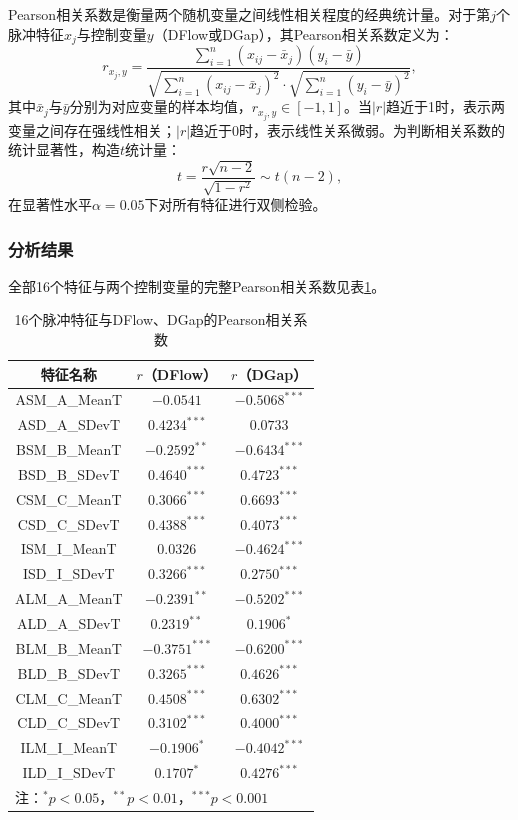 \documentclass[UTF8,a4paper,12pt]{ctexart}
\begin{document}
Pearson相关系数是衡量两个随机变量之间线性相关程度的经典统计量。对于第$j$个脉冲特征$x_j$与控制变量$y$（DFlow或DGap），其Pearson相关系数定义为：
\begin{equation}
r_{x_j,y}=\frac{\displaystyle\sum_{i=1}^{n}(x_{ij}-\bar{x}_j)(y_i-\bar{y})}{\displaystyle\sqrt{\sum_{i=1}^{n}(x_{ij}-\bar{x}_j)^2}\cdot\sqrt{\sum_{i=1}^{n}(y_i-\bar{y})^2}},
\label{eq:pearson}
\end{equation}
其中$\bar{x}_j$与$\bar{y}$分别为对应变量的样本均值，$r_{x_j,y}\in[-1,1]$。当$|r|$趋近于1时，表示两变量之间存在强线性相关；$|r|$趋近于0时，表示线性关系微弱。为判断相关系数的统计显著性，构造$t$统计量：
\begin{equation}
t=\frac{r\sqrt{n-2}}{\sqrt{1-r^2}}\sim t(n-2),
\end{equation}
在显著性水平$\alpha=0.05$下对所有特征进行双侧检验。

\subsubsection{分析结果}

全部16个特征与两个控制变量的完整Pearson相关系数见表\ref{tab:corr-full}。

\begin{table}[H]
\centering
\caption{16个脉冲特征与DFlow、DGap的Pearson相关系数}
\label{tab:corr-full}
\begin{tabular}{ccc}
\toprule
特征名称 & $r$（DFlow） & $r$（DGap） \\
\midrule
ASM\_A\_MeanT & $-0.0541$ & $-0.5068^{***}$ \\
ASD\_A\_SDevT & $0.4234^{***}$ & $0.0733$ \\
BSM\_B\_MeanT & $-0.2592^{**}$ & $-0.6434^{***}$ \\
BSD\_B\_SDevT & $0.4640^{***}$ & $0.4723^{***}$ \\
CSM\_C\_MeanT & $0.3066^{***}$ & $0.6693^{***}$ \\
CSD\_C\_SDevT & $0.4388^{***}$ & $0.4073^{***}$ \\
ISM\_I\_MeanT & $0.0326$ & $-0.4624^{***}$ \\
ISD\_I\_SDevT & $0.3266^{***}$ & $0.2750^{***}$ \\
ALM\_A\_MeanT & $-0.2391^{**}$ & $-0.5202^{***}$ \\
ALD\_A\_SDevT & $0.2319^{**}$ & $0.1906^{*}$ \\
BLM\_B\_MeanT & $-0.3751^{***}$ & $-0.6200^{***}$ \\
BLD\_B\_SDevT & $0.3265^{***}$ & $0.4626^{***}$ \\
CLM\_C\_MeanT & $0.4508^{***}$ & $0.6302^{***}$ \\
CLD\_C\_SDevT & $0.3102^{***}$ & $0.4000^{***}$ \\
ILM\_I\_MeanT & $-0.1906^{*}$ & $-0.4042^{***}$ \\
ILD\_I\_SDevT & $0.1707^{*}$ & $0.4276^{***}$ \\
\bottomrule
\multicolumn{3}{l}{\footnotesize 注：$^{*}p<0.05$，$^{**}p<0.01$，$^{***}p<0.001$}
\end{tabular}
\end{table}
\end{document}
